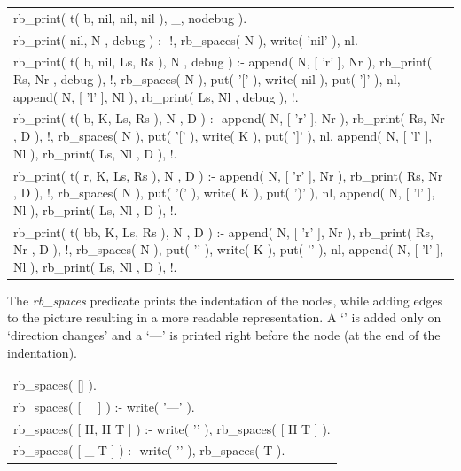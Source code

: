 \documentclass{article}
\newenvironment{code}{\obeycr\begin{it}\nopagebreak\addvspace{1ex}\noindent\footnotesize\begin{tabular}{|p{0.95\textwidth}|}\hline}{\\\hline\end{tabular}\par\addvspace{1ex}\end{it}\restorecr}
\newcommand{\inlinecode}[1]{\textit{#1}}
\begin{document}
\begin{code}
rb\_print( t( b, nil, nil, nil ), \_, nodebug ).\\
rb\_print( nil, N , debug ) :- !, 
\hspace{2ex}rb\_spaces( N ), write( 'nil' ), nl.\\
rb\_print( t( b, nil, Ls, Rs ), N , debug ) :- 
\hspace{2ex}append( N, [ 'r' ], Nr ), rb\_print( Rs, Nr , debug ), !, 
\hspace{2ex}rb\_spaces( N ), put( '[' ), write( nil ), put( ']' ), nl,
\hspace{2ex}append( N, [ 'l' ], Nl ), rb\_print( Ls, Nl , debug ), !.\\
rb\_print( t( b, K, Ls, Rs ), N , D ) :-
\hspace{2ex}append( N, [ 'r' ], Nr ), rb\_print( Rs, Nr , D ), !, 
\hspace{2ex}rb\_spaces( N ), put( '[' ), write( K ), put( ']' ), nl,
\hspace{2ex}append( N, [ 'l' ], Nl ), rb\_print( Ls, Nl , D ), !.\\
rb\_print( t( r, K, Ls, Rs ), N , D ) :-
\hspace{2ex}append( N, [ 'r' ], Nr ), rb\_print( Rs, Nr , D ), !, 
\hspace{2ex}rb\_spaces( N ), put( '(' ), write( K ), put( ')' ), nl,
\hspace{2ex}append( N, [ 'l' ], Nl ), rb\_print( Ls, Nl , D ), !.\\
rb\_print( t( bb, K, Ls, Rs ), N , D ) :-
\hspace{2ex}append( N, [ 'r' ], Nr ), rb\_print( Rs, Nr , D ), !, 
\hspace{2ex}rb\_spaces( N ), put( '{' ), write( K ), put( '}' ), nl,
\hspace{2ex}append( N, [ 'l' ], Nl ), rb\_print( Ls, Nl , D ), !.
\end{code}

The \inlinecode{rb\_spaces} predicate prints the indentation of the nodes, while adding edges to the picture resulting in a more readable representation. A `\textbar' is added only on `direction changes' and a `\hspace{1ex}\textbar---' is printed right before the node (at the end of the indentation).

\begin{code}
rb\_spaces( [] ).\\
rb\_spaces( [ \_ ] ) :- 
\hspace{2ex}write( '\hspace{1ex}\textbar---' ).\\
rb\_spaces( [ H, H \textbar T ] ) :-
\hspace{2ex}write( '\hspace{5ex}' ), 
\hspace{2ex}rb\_spaces( [ H \textbar T ] ).\\
rb\_spaces( [ \_ \textbar T ] ) :-
\hspace{2ex}write( '\hspace{1ex}\textbar\hspace{3ex}' ), 
\hspace{2ex}rb\_spaces( T ).
\end{code}
\end{document}
